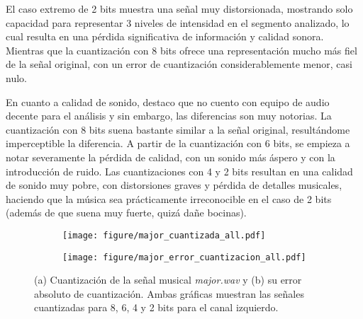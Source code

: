 \documentclass[paper=letter, fontsize=11pt, draft=false]{scrartcl}
\numberwithin{equation}{problemcounter} %
\numberwithin{figure}{problemcounter} %
\numberwithin{table}{problemcounter} %
\numberwithin{subsection}{problemcounter}
\begin{document}
El caso extremo de 2 bits muestra una señal muy distorsionada, mostrando solo capacidad para representar 3 niveles de intensidad en el segmento analizado, lo cual resulta en una pérdida significativa de información y calidad sonora. Mientras que la cuantización con 8 bits ofrece una representación mucho más fiel de la señal original, con un error de cuantización considerablemente menor, casi nulo.

En cuanto a calidad de sonido, destaco que no cuento con equipo de audio decente para el análisis y sin embargo, las diferencias son muy notorias. La cuantización con 8 bits suena bastante similar a la señal original, resultándome imperceptible la diferencia. A partir de la cuantización con 6 bits, se empieza a notar severamente la pérdida de calidad, con un sonido más áspero y con la introducción de ruido. Las cuantizaciones con 4 y 2 bits resultan en una calidad de sonido muy pobre, con distorsiones graves y pérdida de detalles musicales, haciendo que la música sea prácticamente irreconocible en el caso de 2 bits (además de que suena muy fuerte, quizá dañe bocinas).


\begin{figure}
    \centering
    \begin{subfigure}[b]{\linewidth}
        \centering
        \texttt{[image: figure/major\_cuantizada\_all.pdf]}
        \caption{}
        \label{fig:major_a}
    \end{subfigure}
    \vspace{0.5cm}
    \begin{subfigure}[b]{\linewidth}
        \centering
        \texttt{[image: figure/major\_error\_cuantizacion\_all.pdf]}
        \caption{}
        \label{fig:major_b}
    \end{subfigure}
    \caption{(a) Cuantización de la señal musical \textit{major.wav} y (b) su error absoluto de cuantización. Ambas gráficas muestran las señales cuantizadas para 8, 6, 4 y 2 bits para el canal izquierdo.}
    \label{fig:major}
\end{figure}
\end{document}
